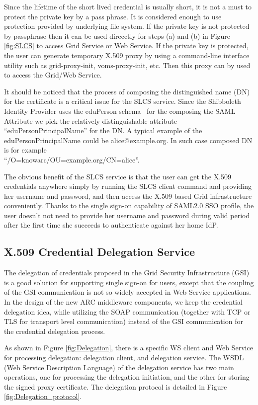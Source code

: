 \documentclass[twocolumn]{svjour3}         %
\begin{document}
Since the lifetime of the short lived credential is usually short, it is not a must to protect the private key by a pass phrase. It is considered enough to use protection provided by underlying file system. If the private key is not protected by passphrase then it can be used direcctly for steps (a) and (b) in Figure \ref{fig:SLCS} to access Grid Service or Web Service. If the private key is protected, the user can generate temporary X.509 proxy by using a command-line interface utility such as grid-proxy-init, voms-proxy-init, etc. Then this proxy can by used  to access the Grid/Web Service.

It should be noticed that the process of composing the distinguished name (DN) for the certificate is a critical issue for the SLCS service. Since the Shibboleth Identity Provider uses the eduPerson schema~\cite{eduSchemalink} for the composing the SAML Attribute we pick the relatively distinguishable attribute ``eduPersonPrincipalName'' for the DN. A typical example of the eduPersonPrincipalName could be alice@example.org. In such case composed DN is for example\\``/O=knowarc/OU=example.org/CN=alice''.

The obvious benefit of the SLCS service is that the user can get the X.509 credentials anywhere simply by running the SLCS client command and providing her username and password, and then access the X.509 based Grid infrastructure conveniently. Thanks to the single sign-on capability of SAML2.0 SSO profile, the user doesn't not need to provide her username and password during valid period after the first time she succeeds to authenticate against her home IdP.

\subsection{X.509 Credential Delegation Service}
\label{sec:creddeleg}
The delegation of credentials proposed in the Grid Security Infrastructure (GSI) is a good solution for supporting single sign-on for users, except that the coupling of the GSI communication is not so widely accepted in Web Service applications. In the design of the new ARC middleware components, we keep the credential delegation idea, while utilizing the SOAP communication (together with TCP or TLS for transport level communication) instead of the GSI communication for the credential delegation process.

As shown in Figure \ref{fig:Delegation}, there is a specific WS client and Web Service for processing delegation: delegation client, and delegation service. The WSDL (Web Service Description Language) of the delegation service has two main operations, one for processing the delegation initiation, and the other for storing the signed proxy certificate. The delegation protocol is detailed in Figure \ref{fig:Delegation_protocol}.
\end{document}
